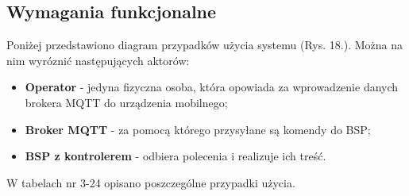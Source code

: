\subsection{Wymagania funkcjonalne}
Poniżej przedstawiono diagram przypadków użycia systemu (Rys. 18.). Można na nim wyróznić następujących aktorów:
\begin{itemize}
\item \textbf{Operator} - jedyna fizyczna osoba, która opowiada za wprowadzenie danych brokera MQTT do urządzenia mobilnego;
\item \textbf{Broker MQTT} - za pomocą którego przysyłane są komendy do BSP;
\item \textbf{BSP z kontrolerem} - odbiera polecenia i realizuje ich treść.
\end{itemize}
W tabelach nr 3-24 opisano poszczególne przypadki użycia.

